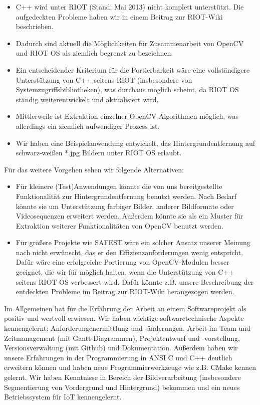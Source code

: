 \documentclass[10pt,a4paper]{article}
\begin{document}
\begin{itemize}
\item C++ wird unter RIOT (Stand: Mai 2013) nicht komplett unterstützt. Die aufgedeckten Probleme haben wir in einem Beitrag zur RIOT-Wiki beschrieben. 
\item Dadurch sind aktuell die Möglichkeiten für Zusammenarbeit von OpenCV und RIOT OS als ziemlich begrenzt zu bezeichnen. 
\item Ein entscheidender Kriterium für die Portierbarkeit wäre eine vollständigere Unterstützung von C++ seitens RIOT (insbesondere von Systemzugriffsbibliotheken), was durchaus möglich scheint, da RIOT OS ständig weiterentwickelt und aktualisiert wird.
\item Mittlerweile ist Extraktion einzelner OpenCV-Algorithmen möglich, was allerdings ein ziemlich aufwendiger Prozess ist.
\item Wir haben eine Beispielanwendung entwickelt, das Hintergrundentfernung auf schwarz-weißen *.jpg Bildern unter RIOT OS erlaubt.
\end{itemize}

Für das weitere Vorgehen sehen wir folgende Alternativen: \\

\begin{itemize}
\item Für kleinere (Test)Anwendungen könnte die von uns bereitgestellte Funktionalität zur Hintergrundentfernung benutzt werden. Nach Bedarf könnte sie um Unterstützung farbiger Bilder, anderer Bildformate oder Videosequenzen erweitert werden. Außerdem könnte sie als ein Muster für Extraktion weiterer Funktionalitäten von OpenCV benutzt werden.
\item Für größere Projekte wie SAFEST wäre ein solcher Ansatz unserer Meinung nach nicht erwünscht, das er den Effizienzanforderungen wenig entspricht. Dafür wäre eine erfolgreiche Portierung von OpenCV-Modulen besser geeignet, die wir für möglich halten, wenn die Unterstützung von C++ seitens RIOT OS verbessert wird. Dafür könnte z.B. unsere Beschreibung der entdeckten Probleme im Beitrag zur RIOT-Wiki herangezogen werden. 
\end{itemize}

Im Allgemeinen hat für die Erfahrung der Arbeit an einem Softwareprojekt als positiv und wertvoll erwiesen. Wir haben wichtige softwaretechnische Aspekte kennengelernt: Anforderungenermittlung und -änderungen, Arbeit im Team und Zeitmanagement (mit Gantt-Diagrammen), Projektentwurf und -vorstellung, Versionsverwaltung (mit Github) und Dokumentation. Außerdem haben wir unsere Erfahrungen in der Programmierung in ANSI C und C++ deutlich erweitern können und haben neue Programmierwerkzeuge wie z.B. CMake kennen gelernt. Wir haben Kenntnisse in Bereich der Bildverarbeitung (insbesondere Segmentierung von Vordergrund und Hintergrund) bekommen und ein neues Betriebssystem für IoT kennengelernt. \\
\end{document}

